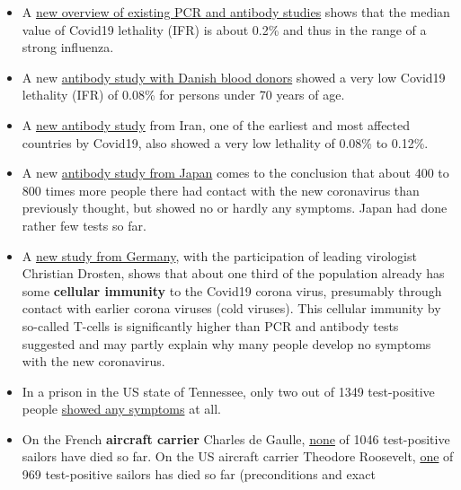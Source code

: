 \begin{itemize}
\tightlist
\item
  A \href{https://swprs.org/studies-on-covid-19-lethality/}{new overview
  of existing PCR and antibody studies} shows that the median value of
  Covid19 lethality (IFR) is about 0.2\% and thus in the range of a
  strong influenza.
\item
  A new
  \href{https://www.medrxiv.org/content/10.1101/2020.04.24.20075291v1}{antibody
  study with Danish blood donors} showed a very low Covid19 lethality
  (IFR) of 0.08\% for persons under 70 years of age.
\item
  A
  \href{https://www.medrxiv.org/content/10.1101/2020.04.26.20079244v1}{new
  antibody study} from Iran, one of the earliest and most affected
  countries by Covid19, also showed a very low lethality of 0.08\% to
  0.12\%.
\item
  A new
  \href{https://www.medrxiv.org/content/10.1101/2020.04.26.20079822v1}{antibody
  study from Japan} comes to the conclusion that about 400 to 800 times
  more people there had contact with the new coronavirus than previously
  thought, but showed no or hardly any symptoms. Japan had done rather
  few tests so far.
\item
  A
  \href{https://www.medrxiv.org/content/10.1101/2020.04.17.20061440v1}{new
  study from Germany}, with the participation of leading virologist
  Christian Drosten, shows that about one third of the population
  already has some \textbf{cellular immunity} to the Covid19 corona
  virus, presumably through contact with earlier corona viruses (cold
  viruses). This cellular immunity by so-called T-cells is significantly
  higher than PCR and antibody tests suggested and may partly explain
  why many people develop no symptoms with the new coronavirus.
\item
  In a prison in the US state of Tennessee, only two out of 1349
  test-positive people
  \href{https://www.tennessean.com/story/news/politics/2020/05/01/tennessee-testing-all-inmates-prison-staff-after-multiple-outbreaks/3067388001/}{showed
  any symptoms} at all.
\item
  On the French \textbf{aircraft carrier} Charles de Gaulle,
  \href{https://en.wikipedia.org/wiki/COVID-19_pandemic_on_Charles_de_Gaulle}{none}
  of 1046 test-positive sailors have died so far. On the US aircraft
  carrier Theodore Roosevelt,
  \href{https://en.wikipedia.org/wiki/COVID-19_pandemic_on_USS_Theodore_Roosevelt}{one}
  of 969 test-positive sailors has died so far (preconditions and exact

\end{itemize}
